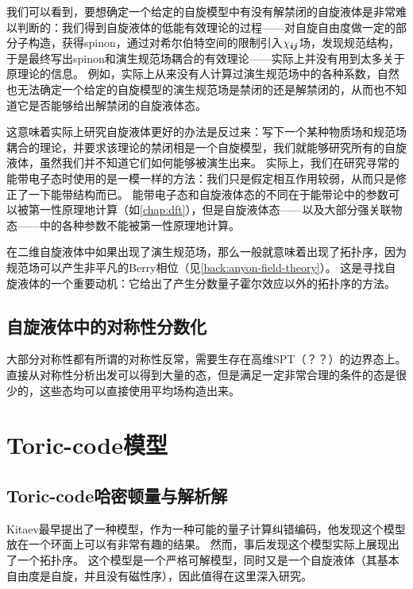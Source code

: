 我们可以看到，要想确定一个给定的自旋模型中有没有解禁闭的自旋液体是非常难以判断的：我们得到自旋液体的低能有效理论的过程——对自旋自由度做一定的部分子构造，获得spinon，通过对希尔伯特空间的限制引入$\chi_{\vb*{i} \vb*{j}}$场，发现规范结构，于是最终写出spinon和演生规范场耦合的有效理论——实际上并没有用到太多关于原理论的信息。
例如，实际上从来没有人计算过演生规范场中的各种系数，自然也无法确定一个给定的自旋模型的演生规范场是禁闭的还是解禁闭的，从而也不知道它是否能够给出解禁闭的自旋液体态。

这意味着实际上研究自旋液体更好的办法是反过来：写下一个某种物质场和规范场耦合的理论，并要求该理论的禁闭相是一个自旋模型，我们就能够研究所有的自旋液体，虽然我们并不知道它们如何能够被演生出来。
实际上，我们在研究寻常的能带电子态时使用的是一模一样的方法：我们只是假定相互作用较弱，从而只是修正了一下能带结构而已。
能带电子态和自旋液体态的不同在于能带论中的参数可以被第一性原理地计算（如\autoref{chap:dft}），但是自旋液体态——以及大部分强关联物态——中的各种参数不能被第一性原理地计算。

在二维自旋液体中如果出现了演生规范场，那么一般就意味着出现了拓扑序，因为规范场可以产生非平凡的Berry相位（见\autoref{back:anyon-field-theory}）。
这是寻找自旋液体的一个重要动机：它给出了产生分数量子霍尔效应以外的拓扑序的方法。

\subsection{自旋液体中的对称性分数化}

大部分对称性都有所谓的对称性反常，需要生存在高维SPT（？？）的边界态上。
直接从对称性分析出发可以得到大量的态，但是满足一定非常合理的条件的态是很少的，这些态均可以直接使用平均场构造出来。

\section{Toric-code模型}

\subsection{Toric-code哈密顿量与解析解}

Kitaev最早提出了一种模型，作为一种可能的量子计算纠错编码，他发现这个模型放在一个环面上可以有非常有趣的结果。
然而，事后发现这个模型实际上展现出了一个拓扑序。
这个模型是一个严格可解模型，同时又是一个自旋液体（其基本自由度是自旋，并且没有磁性序），因此值得在这里深入研究。

